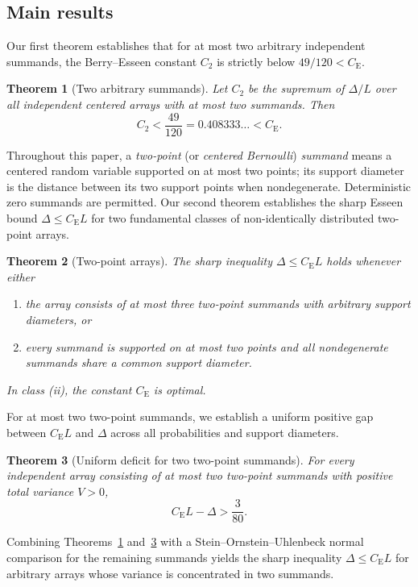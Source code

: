 \documentclass[11pt]{article}
\numberwithin{equation}{section}
\newtheorem{theorem}{Theorem}[section]
\theoremstyle{definition}
\theoremstyle{remark}
\newcommand{\be}{C_{\mathrm E}}
\begin{document}
\subsection{Main results}

Our first theorem establishes that for at most two arbitrary independent
summands, the Berry--Esseen constant $C_2$ is strictly below $49/120<\be$.

\begin{theorem}[Two arbitrary summands]\label{thm:arbitrary-two}
Let $C_2$ be the supremum of $\Delta/L$ over all independent centered arrays
with at most two summands. Then
\[
 C_2<\frac{49}{120}=0.408333\ldots<\be.
\]
\end{theorem}

Throughout this paper, a \emph{two-point} (or \emph{centered Bernoulli})
\emph{summand} means a centered random variable supported on at most two
points; its support diameter is the distance between its two support points
when nondegenerate. Deterministic zero summands are permitted. Our second
theorem establishes the sharp Esseen bound $\Delta\le\be L$ for two fundamental
classes of non-identically distributed two-point arrays.

\begin{theorem}[Two-point arrays]\label{thm:bernoulli-classes}
The sharp inequality $\Delta\le\be L$ holds whenever either
\begin{enumerate}[label=(\roman*),leftmargin=2em]
\item the array consists of at most three two-point summands with arbitrary
support diameters, or
\item every summand is supported on at most two points and all nondegenerate
summands share a common support diameter.
\end{enumerate}
In class \textup{(ii)}, the constant $\be$ is optimal.
\end{theorem}

For at most two two-point summands, we establish a uniform positive gap
between $\be L$ and $\Delta$ across all probabilities and support diameters.

\begin{theorem}[Uniform deficit for two two-point summands]\label{thm:two-summands}
For every independent array consisting of at most two two-point summands
with positive total variance $V>0$,
\[
 \be L-\Delta>\frac3{80}.
\]
\end{theorem}

Combining Theorems~\ref{thm:arbitrary-two} and~\ref{thm:two-summands} with
a Stein--Ornstein--Uhlenbeck normal comparison for the remaining summands
yields the sharp inequality $\Delta\le\be L$ for arbitrary arrays whose
variance is concentrated in two summands.
\end{document}
